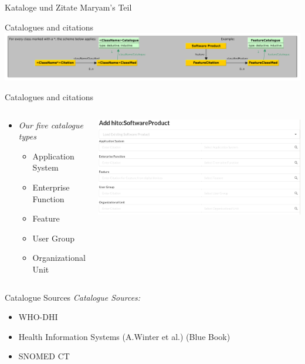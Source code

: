 \documentclass[aspectratio=1610,12pt]{beamer}
\newcommand{\enquote}[1]{{\glqq#1\grqq{}}}
\begin{document}
\begin{frame}{Kataloge und Zitate}
  \centering
  \huge Maryam's Teil
\end{frame}

\begin{frame}{Catalogues and citations}
\pause
\centering
\includegraphics[width=\textwidth]{img/excerpt1.pdf}
\end{frame}

\begin{frame}{Catalogues and citations}
\begin{columns}
  \vspace{-1cm}
  \begin{spacing}{1.25}
    \begin{itemize}
      \item \emph{Our five catalogue types}
      \begin{itemize}
        \item Application System
        \item Enterprise Function
        \item Feature
        \item User Group
        \item Organizational Unit
      \end{itemize}
    \end{itemize}
  \end{spacing}
  \centering
  \includegraphics[width=\textwidth]{img/iglook.png}
\end{columns}
\end{frame}

\begin{frame}{Catalogue Sources}
  \emph{Catalogue Sources:}
  \begin{itemize}
    \item WHO-DHI
    \item Health Information Systems (A.Winter et al.) (\enquote{Blue Book})
    \item SNOMED CT
  \end{itemize}
\end{frame}
\end{document}
